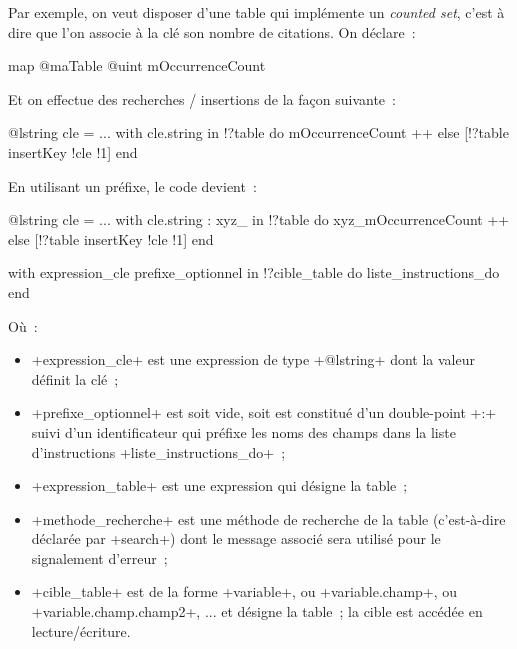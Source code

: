 Par exemple, on veut disposer d'une table qui implémente un \emph{counted set}, c'est à dire que l'on associe à la clé son nombre de citations. On déclare~:
\begin{galgas}
map @maTable {
  @uint mOccurrenceCount
}
\end{galgas}

Et on effectue des recherches / insertions de la façon suivante~:
\begin{galgas}
@lstring cle = ...
with cle.string in !?table do
  mOccurrenceCount ++
else
  [!?table insertKey !cle !1]
end
\end{galgas}

En utilisant un préfixe, le code devient~:
\begin{galgas}
@lstring cle = ...
with cle.string : xyz_ in !?table do
  xyz_mOccurrenceCount ++
else
  [!?table insertKey !cle !1]
end
\end{galgas}





\begin{galgas}
with expression_cle prefixe_optionnel in !?cible_table
do
  liste_instructions_do
end
\end{galgas}

Où~:
\begin{itemize}
  \item \ggs+expression_cle+ est une expression de type \ggs+@lstring+ dont la valeur définit la clé~;
  \item \ggs+prefixe_optionnel+ est soit vide, soit est constitué d'un double-point \ggs+:+ suivi d'un identificateur qui préfixe les noms des champs dans la liste d'instructions \ggs+liste_instructions_do+~;
  \item \ggs+expression_table+ est une expression qui désigne la table~;
  \item \ggs+methode_recherche+ est une méthode de recherche de la table (c'est-à-dire déclarée par \ggs+search+) dont le message associé sera utilisé pour le signalement d'erreur~;
  \item \ggs+cible_table+ est de la forme \ggs+variable+, ou  \ggs+variable.champ+, ou \ggs+variable.champ.champ2+, ... et désigne la table~; la cible est accédée en lecture/écriture.
\end{itemize}

